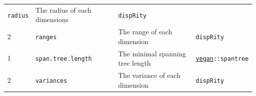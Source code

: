 \documentclass[]{book}
\theoremstyle{definition}
\theoremstyle{definition}
\theoremstyle{remark}
\begin{document}
\begin{longtable}[]{@{}llll@{}}
\begin{minipage}[t]{0.08\columnwidth}
\texttt{radius}\strut
\end{minipage} & \begin{minipage}[t]{0.61\columnwidth}\raggedright\strut
The radius of each dimensions\strut
\end{minipage} & \begin{minipage}[t]{0.11\columnwidth}\raggedright\strut
\texttt{dispRity}\strut
\end{minipage}\tabularnewline
\begin{minipage}[t]{0.08\columnwidth}\raggedright\strut
2\strut
\end{minipage} & \begin{minipage}[t]{0.08\columnwidth}\raggedright\strut
\texttt{ranges}\strut
\end{minipage} & \begin{minipage}[t]{0.61\columnwidth}\raggedright\strut
The range of each dimension\strut
\end{minipage} & \begin{minipage}[t]{0.11\columnwidth}\raggedright\strut
\texttt{dispRity}\strut
\end{minipage}\tabularnewline
\begin{minipage}[t]{0.08\columnwidth}\raggedright\strut
1\strut
\end{minipage} & \begin{minipage}[t]{0.08\columnwidth}\raggedright\strut
\texttt{span.tree.length}\strut
\end{minipage} & \begin{minipage}[t]{0.61\columnwidth}\raggedright\strut
The minimal spanning tree length\strut
\end{minipage} & \begin{minipage}[t]{0.11\columnwidth}\raggedright\strut
\href{https://cran.r-project.org/web/packages/vegan/index.html}{\texttt{vegan}}\texttt{::spantree}\strut
\end{minipage}\tabularnewline
\begin{minipage}[t]{0.08\columnwidth}\raggedright\strut
2\strut
\end{minipage} & \begin{minipage}[t]{0.08\columnwidth}\raggedright\strut
\texttt{variances}\strut
\end{minipage} & \begin{minipage}[t]{0.61\columnwidth}\raggedright\strut
The variance of each dimension\strut
\end{minipage} & \begin{minipage}[t]{0.11\columnwidth}\raggedright\strut
\texttt{dispRity}\strut
\end{minipage}\tabularnewline
\bottomrule
\end{longtable}
\end{document}
